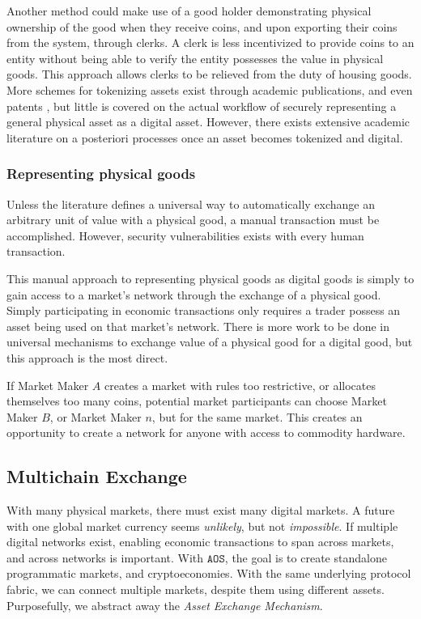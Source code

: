 \documentclass[10pt, titlepage, twocolumn]{report}
\begin{document}
\hspace*{15pt}
Another method could make use of a good holder demonstrating physical ownership of the good when they receive coins, and upon exporting their coins from the system, through clerks. A clerk is less incentivized to provide coins to an entity without being able to verify the entity possesses the value in physical goods. This approach allows clerks to be relieved from the duty of housing goods. More schemes for tokenizing assets exist through academic publications, and even patents \cite{a_patent}, but little is covered on the actual workflow of securely representing a general physical asset as a digital asset. However, there exists extensive academic literature on a posteriori processes once an asset becomes tokenized and digital.


\subsubsection{Representing physical goods}

\hspace*{15pt}
Unless the literature defines a universal way to automatically exchange an arbitrary unit of value with a physical good, a manual transaction must be accomplished. However, security vulnerabilities exists with every human transaction. 

\hspace*{15pt}
This manual approach to representing physical goods as digital goods is simply to gain access to a market's network through the exchange of a physical good. Simply participating in economic transactions only requires a trader possess an asset being used on that market's network. There is more work to be done in universal mechanisms to exchange value of a physical good for a digital good, but this approach is the most direct.

\hspace*{15pt}
If Market Maker \(A\) creates a market with rules too restrictive, or allocates themselves too many coins, potential market participants can choose Market Maker \(B\), or Market Maker \(n\), but for the same market. This creates an opportunity to create a network for anyone with access to commodity hardware. 

\subsection{Multichain Exchange}
\hspace*{15pt}
With many physical markets, there must exist many digital markets. A future with one global market currency seems \textit{unlikely}, but not \textit{impossible}. If multiple digital networks exist, enabling economic transactions to span across markets, and across networks is important. With \(\texttt{AOS}\), the goal is to create standalone programmatic markets, and cryptoeconomies. With the same underlying protocol fabric, we can connect multiple markets, despite them using different assets. Purposefully, we abstract away the \textit{Asset Exchange Mechanism}.
\end{document}
